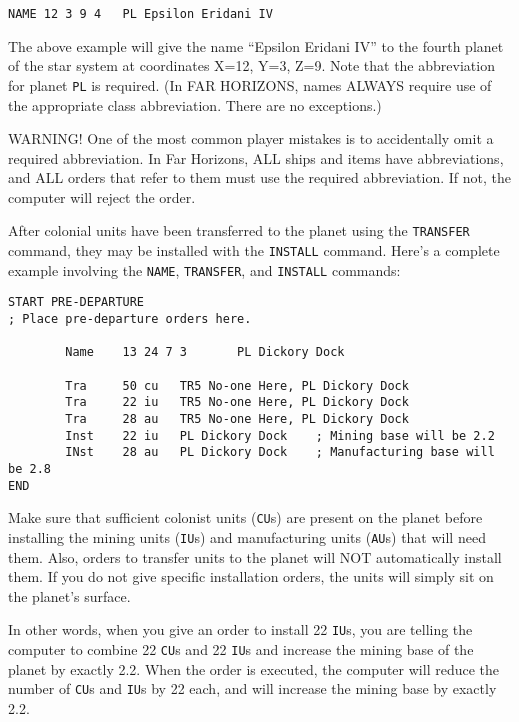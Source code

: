 \documentclass[10pt,titlepage]{article}
\begin{document}
	\begin{verbatim}
NAME 12 3 9 4	PL Epsilon Eridani IV	\end{verbatim} 

The above example will give the name ``Epsilon Eridani IV'' to the fourth planet
of the star system at coordinates X=12, Y=3, Z=9.  Note that the abbreviation
for planet \texttt{PL} is required.  (In FAR HORIZONS, names ALWAYS require use of
the appropriate class abbreviation.  There are no exceptions.)

\begin{warningnote}
	WARNING! One of the most common player mistakes is to accidentally
	omit a required abbreviation.  In Far Horizons, ALL ships and items
	have abbreviations, and ALL orders that refer to them must use the
	required abbreviation.  If not, the computer will reject the order.
\end{warningnote}

\noindent After colonial units have been transferred to the planet using the \texttt{TRANSFER}
command, they may be installed with the \texttt{INSTALL} command.  Here's a complete
example involving the \texttt{NAME}, \texttt{TRANSFER}, and \texttt{INSTALL} commands:

\begin{verbatim}
START PRE-DEPARTURE
; Place pre-departure orders here.

        Name    13 24 7 3       PL Dickory Dock

        Tra     50 cu   TR5 No-one Here, PL Dickory Dock
        Tra     22 iu   TR5 No-one Here, PL Dickory Dock
        Tra     28 au   TR5 No-one Here, PL Dickory Dock
        Inst    22 iu   PL Dickory Dock    ; Mining base will be 2.2
        INst    28 au   PL Dickory Dock    ; Manufacturing base will be 2.8
END\end{verbatim} 

Make sure that sufficient colonist units (\texttt{CU}s) are present on the planet before
installing the mining units (\texttt{IU}s) and manufacturing units (\texttt{AU}s) that will need
them.  Also, orders to transfer units to the planet will NOT automatically
install them.  If you do not give specific installation orders, the units
will simply sit on the planet's surface.

In other words, when you give an order to install 22 \texttt{IU}s, you are telling the
computer to combine 22 \texttt{CU}s and 22 \texttt{IU}s and increase the mining base of the
planet by exactly 2.2.  When the order is executed, the computer will reduce
the number of \texttt{CU}s and \texttt{IU}s by 22 each, and will increase the mining base by
exactly 2.2.
\end{document}
